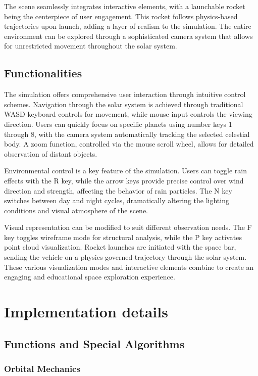 \documentclass[12pt]{report}
\begin{document}
The scene seamlessly integrates interactive elements, with a launchable rocket being the centerpiece of user engagement. This rocket follows physics-based trajectories upon launch, adding a layer of realism to the simulation. The entire environment can be explored through a sophisticated camera system that allows for unrestricted movement throughout the solar system.

\section{Functionalities}
The simulation offers comprehensive user interaction through intuitive control schemes. Navigation through the solar system is achieved through traditional WASD keyboard controls for movement, while mouse input controls the viewing direction. Users can quickly focus on specific planets using number keys 1 through 8, with the camera system automatically tracking the selected celestial body. A zoom function, controlled via the mouse scroll wheel, allows for detailed observation of distant objects.

Environmental control is a key feature of the simulation. Users can toggle rain effects with the R key, while the arrow keys provide precise control over wind direction and strength, affecting the behavior of rain particles. The N key switches between day and night cycles, dramatically altering the lighting conditions and visual atmosphere of the scene.

Visual representation can be modified to suit different observation needs. The F key toggles wireframe mode for structural analysis, while the P key activates point cloud visualization. Rocket launches are initiated with the space bar, sending the vehicle on a physics-governed trajectory through the solar system. These various visualization modes and interactive elements combine to create an engaging and educational space exploration experience.


\chapter{Implementation details}

\section{Functions and Special Algorithms}

\subsection{Orbital Mechanics}
\end{document}
